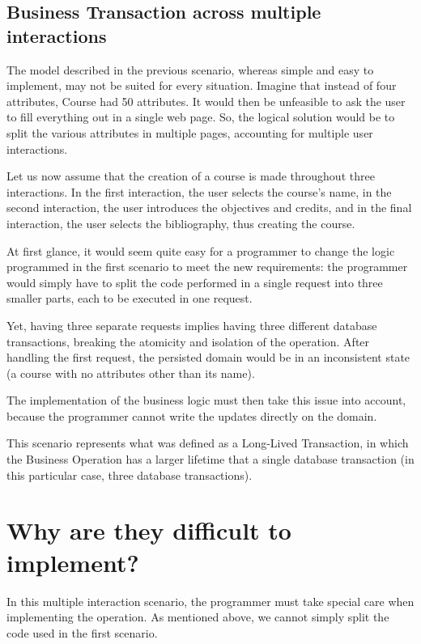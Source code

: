 \subsection{Business Transaction across multiple interactions}

The model described in the previous scenario, whereas simple and easy
to implement, may not be suited for every situation. Imagine that
instead of four attributes, Course had 50 attributes. It would then be
unfeasible to ask the user to fill everything out in a single web
page. So, the logical solution would be to split the various
attributes in multiple pages, accounting for multiple user
interactions.

Let us now assume that the creation of a course is made throughout
three interactions. In the first interaction, the user selects the
course's name, in the second interaction, the user introduces the
objectives and credits, and in the final interaction, the user selects
the bibliography, thus creating the course.

At first glance, it would seem quite easy for a programmer to change
the logic programmed in the first scenario to meet the new
requirements: the programmer would simply have to split the code
performed in a single request into three smaller parts, each to be
executed in one request.

Yet, having three separate requests implies having three different
database transactions, breaking the atomicity and isolation of the
operation. After handling the first request, the persisted domain
would be in an inconsistent state (a course with no attributes other
than its name).

The implementation of the business logic must then take this issue
into account, because the programmer cannot write the updates directly
on the domain.

This scenario represents what was defined as a Long-Lived Transaction,
in which the Business Operation has a larger lifetime that a single
database transaction (in this particular case, three database
transactions).

\section{Why are they difficult to implement?}
\label{sec:difficult}

In this multiple interaction scenario, the programmer must take
special care when implementing the operation. As mentioned above, we
cannot simply split the code used in the first scenario.

